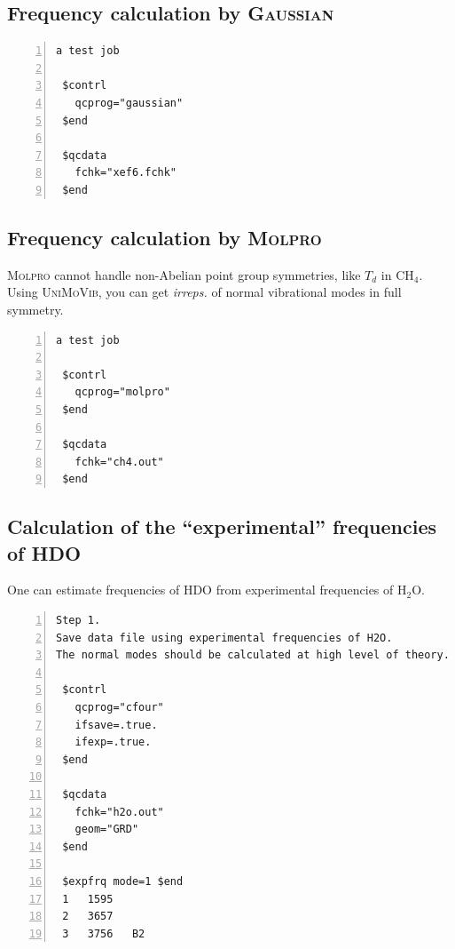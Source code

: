 \documentclass[12pt,english]{extarticle}
\begin{document}
\subsection{Frequency calculation by \textsc{Gaussian}} \label{sec:exp2}

\begin{Verbatim}[frame=single,label=example,labelposition=topline,numbers=left,rulecolor=\color{green},fontsize=\footnotesize,baselinestretch=1.0]
a test job

 $contrl
   qcprog="gaussian"
 $end

 $qcdata
   fchk="xef6.fchk"
 $end
\end{Verbatim}

\subsection{Frequency calculation by \textsc{Molpro}} \label{sec:exp3}

\textsc{Molpro} cannot handle non-Abelian point group symmetries, like $T_d$ in CH$_4$. Using \textsc{UniMoVib}, you can get \emph{irreps.} of normal vibrational modes in full symmetry.

\begin{Verbatim}[frame=single,label=example,labelposition=topline,numbers=left,rulecolor=\color{green},fontsize=\footnotesize,baselinestretch=1.0]
a test job

 $contrl
   qcprog="molpro"
 $end

 $qcdata
   fchk="ch4.out"
 $end
\end{Verbatim}

\subsection{Calculation of the ``experimental'' frequencies of HDO} \label{sec:exp4}

One can estimate frequencies of HDO from experimental frequencies of H$_2$O.

\begin{Verbatim}[frame=single,label=example,labelposition=topline,numbers=left,rulecolor=\color{green},fontsize=\footnotesize,baselinestretch=1.0]
Step 1.
Save data file using experimental frequencies of H2O.
The normal modes should be calculated at high level of theory.

 $contrl
   qcprog="cfour"
   ifsave=.true.
   ifexp=.true.
 $end

 $qcdata
   fchk="h2o.out"
   geom="GRD"
 $end

 $expfrq mode=1 $end
 1   1595
 2   3657
 3   3756   B2
\end{Verbatim}
\end{document}
